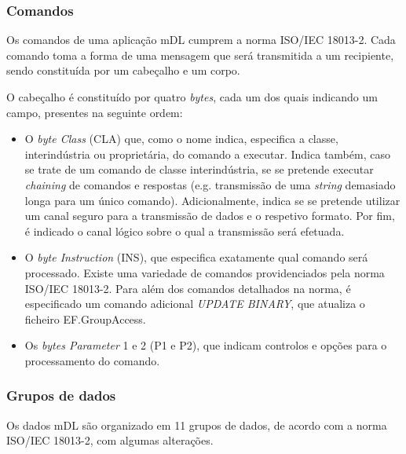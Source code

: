 
\subsubsection{Comandos}

Os comandos de uma aplicação mDL cumprem a norma ISO/IEC 18013-2. Cada comando toma a forma de uma mensagem que será transmitida a um recipiente, sendo constituída por um cabeçalho e um corpo.

O cabeçalho é constituído por quatro \textit{bytes}, cada um dos quais indicando um campo, presentes na seguinte ordem:
\begin{itemize}
    \item O \textit{byte Class} (CLA) que, como o nome indica, especifica a classe, interindústria ou proprietária, do comando a executar. Indica também, caso se trate de um comando de classe interindústria, se se pretende executar \textit{chaining} de comandos e respostas (e.g. transmissão de uma \textit{string} demasiado longa para um único comando). Adicionalmente, indica se se pretende utilizar um canal seguro para a transmissão de dados e o respetivo formato. Por fim, é indicado o canal lógico sobre o qual a transmissão será efetuada.

    \item O \textit{byte Instruction} (INS), que especifica exatamente qual comando será processado. Existe uma variedade de comandos providenciados pela norma ISO/IEC 18013-2. Para além dos comandos detalhados na norma, é especificado um comando adicional \textit{UPDATE BINARY}, que atualiza o ficheiro EF.GroupAccess.%

    \item Os \textit{bytes Parameter} 1 e 2 (P1 e P2), que indicam controlos e opções para o processamento do comando.
\end{itemize}


\subsubsection{Grupos de dados}

Os dados mDL são organizado em 11 grupos de dados, de acordo com a norma ISO/IEC 18013-2, com algumas alterações. 

